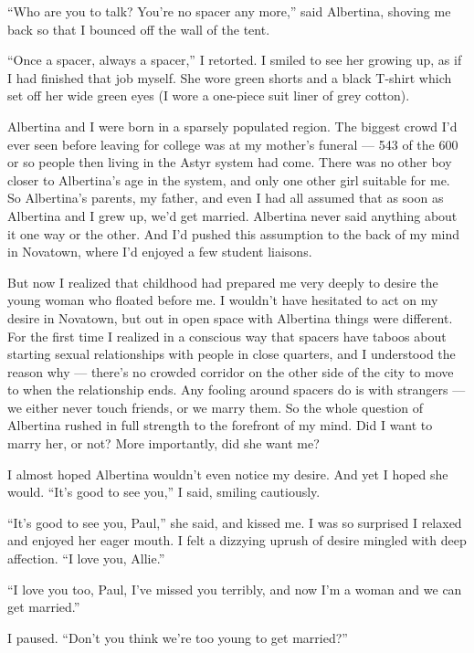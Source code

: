 \documentclass[english,11pt,letterpaper,onecolumn]{scrbook}
\begin{document}
	``Who are you to talk?  You're no spacer any more,'' said Albertina, shoving me back so that I bounced off the wall of the tent.

	``Once a spacer, always a spacer,'' I retorted.  I smiled to see her growing up, as if I had finished that job myself.  She wore green shorts and a black T-shirt which set off her wide green eyes (I wore a one-piece suit liner of grey cotton).  

	Albertina and I were born in a sparsely populated region.  The biggest crowd I'd ever seen before leaving for college was at my mother's funeral --- 543 of the 600 or so people then living in the Astyr system had come.  There was no other boy closer to Albertina's age in the system, and only one other girl suitable for me.  So Albertina's parents, my father, and even I had all assumed that as soon as Albertina and I grew up, we'd get married.  Albertina never said anything about it one way or the other.  And I'd pushed this assumption to the back of my mind in Novatown, where I'd enjoyed a few student liaisons.  

	But now I realized that childhood had prepared me very deeply to desire the young woman who floated before me.  I wouldn't have hesitated to act on my desire in Novatown, but out in open space with Albertina things were different.  For the first time I realized in a conscious way that spacers have taboos about starting sexual relationships with people in close quarters, and I understood the reason why --- there's no crowded corridor on the other side of the city to move to when the relationship ends.  Any fooling around spacers do is with strangers --- we either never touch friends, or we marry them.  So the whole question of Albertina rushed in full strength to the forefront of my mind.  Did I want to marry her, or not?  More importantly, did she want me?

	I almost hoped Albertina wouldn't even notice my desire.  And yet I hoped she would.  ``It's good to see you,'' I said, smiling cautiously.

	``It's good to see you, Paul,'' she said, and kissed me.  I was so surprised I relaxed and enjoyed her eager mouth.  I felt a dizzying uprush of desire mingled with deep affection.  ``I love you, Allie.''

	``I love you too, Paul, I've missed you terribly, and now I'm a woman and we can get married.''

	I paused.  ``Don't you think we're too young to get married?''
\end{document}
